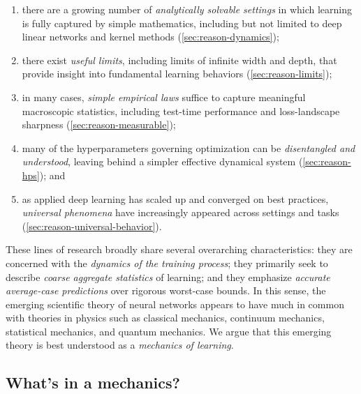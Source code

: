 \begin{enumerate}
    \item there are a growing number of \textit{analytically solvable settings} in which learning is fully captured by simple mathematics, including but not limited to deep linear networks and kernel methods (\cref{sec:reason-dynamics});
    \item there exist \textit{useful limits}, including limits of infinite width and depth, that provide insight into fundamental learning behaviors (\cref{sec:reason-limits});
    \item in many cases, \textit{simple empirical laws} suffice to capture meaningful macroscopic statistics, including test-time performance and loss-landscape sharpness (\cref{sec:reason-measurable});
    \item many of the hyperparameters governing optimization can be \textit{disentangled and understood}, leaving behind a simpler effective dynamical system (\cref{sec:reason-hps}); and
    \item as applied deep learning has scaled up and converged on best practices, \textit{universal phenomena} have increasingly appeared across settings and tasks (\cref{sec:reason-universal-behavior}).
\end{enumerate}

These lines of research broadly share several overarching characteristics: they are concerned with the \textit{dynamics of the training process}; they primarily seek to describe \textit{coarse aggregate statistics} of learning; and they emphasize \textit{accurate average-case predictions} over rigorous worst-case bounds.
In this sense, the emerging scientific theory of neural networks appears to have much in common with theories in physics such as classical mechanics, continuum mechanics, statistical mechanics, and quantum mechanics.
We argue that this emerging theory is best understood as a \textit{mechanics of learning}.



\subsection{What's in a mechanics?}

